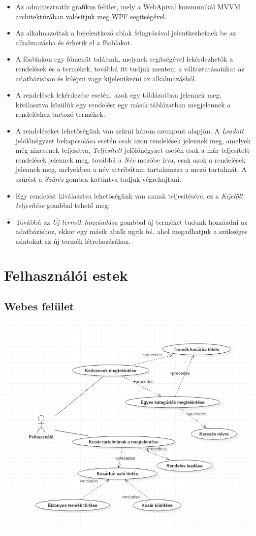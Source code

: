 \documentclass[12pt,a4paper]{article}
\begin{document}
\begin{itemize}
\item Az adminisztratív grafikus felület, mely a WebApival kommunikál MVVM architektúrában valósítjuk meg WPF segítségével.
\item Az alkalmazottak a bejelentkező ablak felugrásával jelentkezhetnek be az alkalmazásba és érhetik el a főablakot.
\item A főablakon egy főmenüt találunk, melynek segítségével lekérdezhetők a rendelések és a termékek, továbbá itt tudjuk menteni a változtatásainkat az adatbázisban és kilépni vagy kijelentkezni az alkalmazásból.
\item A rendelések lekérdezése esetén, azok egy táblázatban jelennek meg, kiválasztva közülük egy rendelést egy másik táblázatban megjelennek a rendeléshez tartozó termékek.
\item A rendeléseket lehetőségünk van szűrni három szempont alapján. A \textit{Leadott} jelölőnégyzet bekapcsolása esetén csak azon rendelések jelennek meg, amelyek még nincsenek teljesítva, \textit{Teljesített} jelölőnégyzet esetén csak a már teljesített rendelések jelennek meg, továbbá a \textit{Név} mezőbe írva, csak azok a rendelések jelennek meg, melyekben a név attribútum tartalmazza a mező tartalmát. A szűrést a \textit{Szűrés} gombra kattintva tudjuk végrehajtani.
\item Egy rendelést kiválasztva lehetőségünk van annak teljesítésére, ez a \textit{Kijelölt teljesítése} gombbal tehető meg.
\item Továbbá az \textit{Új termék hozzáadása} gombbal új terméket tudunk hozzáadni az adatbázishoz, ekkor egy másik abalk ugrik fel, ahol megadhatjuk a szükséges adatokat az új termék létrehozásához.
\end{itemize}

\section{Felhasználói estek}
\subsection{Webes felület}
\includegraphics[scale=0.7]{usecase}
\end{document}
